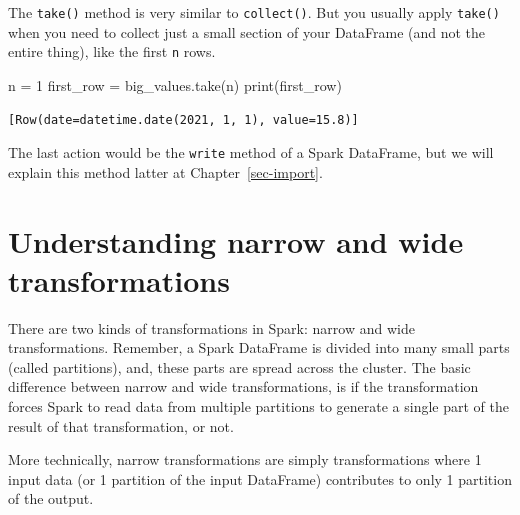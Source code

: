 \documentclass[
  11pt,
  letterpaper,
  DIV=11,
  numbers=noendperiod]{scrreprt}
\newenvironment{Shaded}{\begin{snugshade}}{\end{snugshade}}
\newcommand{\BuiltInTok}[1]{\textcolor[rgb]{0.00,0.23,0.31}{#1}}
\newcommand{\DecValTok}[1]{\textcolor[rgb]{0.68,0.00,0.00}{#1}}
\newcommand{\NormalTok}[1]{\textcolor[rgb]{0.00,0.23,0.31}{#1}}
\newcommand{\OperatorTok}[1]{\textcolor[rgb]{0.37,0.37,0.37}{#1}}
\begin{document}
The \texttt{take()} method is very similar to \texttt{collect()}. But
you usually apply \texttt{take()} when you need to collect just a small
section of your DataFrame (and not the entire thing), like the first
\texttt{n} rows.

\begin{Shaded}
\begin{Highlighting}[]
\NormalTok{n }\OperatorTok{=} \DecValTok{1}
\NormalTok{first\_row }\OperatorTok{=}\NormalTok{ big\_values.take(n)}
\BuiltInTok{print}\NormalTok{(first\_row)}
\end{Highlighting}
\end{Shaded}

\begin{verbatim}
[Row(date=datetime.date(2021, 1, 1), value=15.8)]
\end{verbatim}

The last action would be the \texttt{write} method of a Spark DataFrame,
but we will explain this method latter at Chapter~\ref{sec-import}.

\section{Understanding narrow and wide
transformations}\label{sec-narrow-wide}

There are two kinds of transformations in Spark: narrow and wide
transformations. Remember, a Spark DataFrame is divided into many small
parts (called partitions), and, these parts are spread across the
cluster. The basic difference between narrow and wide transformations,
is if the transformation forces Spark to read data from multiple
partitions to generate a single part of the result of that
transformation, or not.

More technically, narrow transformations are simply transformations
where 1 input data (or 1 partition of the input DataFrame) contributes
to only 1 partition of the output.
\end{document}
